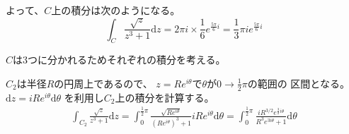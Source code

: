 \documentclass[12pt,b5paper]{ltjsarticle}
\begin{document}
よって、$C$上の積分は次のようになる。
\begin{equation}
 \int_{C} \frac{\sqrt{z}}{z^3+1}\mathrm{d}z
  = 2\pi i \times \frac{1}{6} e^{\frac{5\pi}{6}i}
  = \frac{1}{3} \pi i e^{\frac{5\pi}{6}i}
\end{equation}

$C$は3つに分かれるためそれぞれの積分を考える。

$C_2$は半径$R$の円周上であるので、
$z=Re^{i\theta}$で$\theta$が$0\to \frac{1}{2}\pi$の範囲の
区間となる。
$\mathrm{d}z = iRe^{i\theta}\mathrm{d}\theta$
を利用し$C_2$上の積分を計算する。
\begin{align}
 \int_{C_2} \frac{\sqrt{z}}{z^3+1}\mathrm{d}z
 = \int_{0}^{\frac{1}{2}\pi} \frac{\sqrt{Re^{i\theta}}}{(Re^{i\theta})^3+1} iRe^{i\theta}\mathrm{d}\theta
 = \int_{0}^{\frac{1}{2}\pi} \frac{iR^{3/2}e^{\frac{3}{2}i\theta}}{R^3 e^{3i\theta}+1} \mathrm{d}\theta
\end{align}


\hrulefill
\end{document}
